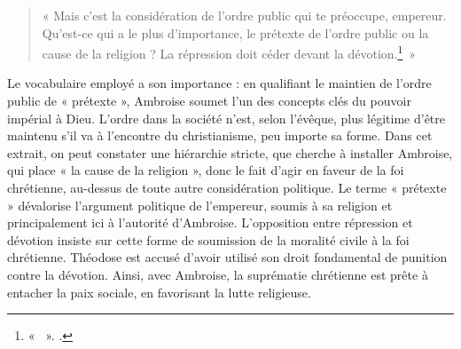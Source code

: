 \bigskip

\begin{quote}
    « Mais c’est la considération de l’ordre public qui te préoccupe, empereur. Qu’est-ce qui a le plus d’importance, le prétexte de l’ordre public ou la cause de la religion ? La répression doit céder devant la dévotion.\footnote{« ~». \cite[, 11]{ambroise_lettres}.}~»
\end{quote}

\bigskip

Le vocabulaire employé a son importance : en qualifiant le maintien de l'ordre public de « prétexte », Ambroise soumet l'un des concepts clés du pouvoir impérial à Dieu. L'ordre dans la société n'est, selon l'évêque, plus légitime d'être maintenu s'il va à l'encontre du christianisme, peu importe sa forme. Dans cet extrait, on peut constater une hiérarchie stricte, que cherche à installer Ambroise, qui place « la cause de la religion », donc le fait d'agir en faveur de la foi chrétienne, au-dessus de toute autre considération politique. Le terme « prétexte » dévalorise l'argument politique de l'empereur, soumis à sa religion et principalement ici à l'autorité d'Ambroise. L'opposition entre répression et dévotion insiste sur cette forme de soumission de la moralité civile à la foi chrétienne. Théodose est accusé d'avoir utilisé son droit fondamental de punition contre la dévotion. Ainsi, avec Ambroise, la suprématie chrétienne est prête à entacher la paix sociale, en favorisant la lutte religieuse.

\bigskip

